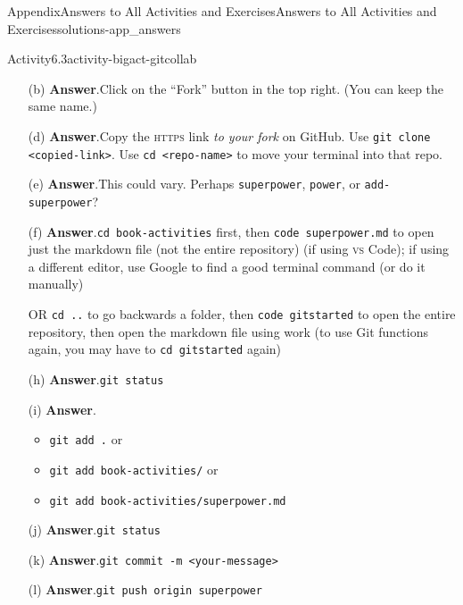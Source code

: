 \documentclass[twoside,10pt,]{book}
\newcommand{\blocktitlefont}{\relax}
\newcommand{\mono}[1]{\texttt{#1}}
\newcommand{\initialism}[1]{\textsc{\MakeLowercase{#1}}}
\begin{document}
\begin{solutions-chapter}{Appendix}{Answers to All Activities and Exercises}{}{Answers to All Activities and Exercises}{}{}{solutions-app_answers}
\begin{activitysolution}{Activity}{6.3}{}{activity-bigact-gitcollab}
\begin{enumerate}[font=\bfseries,label=(\alph*),ref=\alph*]%
\item[(b)]\noindent\textbf{\blocktitlefont Answer}.\hypertarget{answer-bigact-gitcollab-c-b-back}{}\quad{}Click on the ``Fork'' button in the top right. (You can keep the same name.)%
\item[(d)]\noindent\textbf{\blocktitlefont Answer}.\hypertarget{answer-bigact-gitcollab-e-b-back}{}\quad{}Copy the \initialism{HTTPS} link \emph{to your fork} on GitHub. Use \mono{git clone <copied-link>}. Use \mono{cd <repo-name>} to move your terminal into that repo.%
\item[(e)]\noindent\textbf{\blocktitlefont Answer}.\hypertarget{answer-bigact-gitcollab-f-b-back}{}\quad{}This could vary. Perhaps \mono{superpower}, \mono{power}, or \mono{add-superpower}?%
\item[(f)]\noindent\textbf{\blocktitlefont Answer}.\hypertarget{answer-bigact-gitcollab-g-b-back}{}\quad{}\mono{cd book-activities} first, then \mono{code superpower.md} to open just the markdown file (not the entire repository) (if using \initialism{VS} Code); if using a different editor, use Google to find a good terminal command (or do it manually)%
\par
OR \mono{cd ..} to go backwards a folder, then \mono{code gitstarted} to open the entire repository, then open the markdown file using work (to use Git functions again, you may have to \mono{cd gitstarted} again)%
\item[(h)]\noindent\textbf{\blocktitlefont Answer}.\hypertarget{answer-bigact-gitcollab-i-b-back}{}\quad{}\mono{git status}%
\item[(i)]\noindent\textbf{\blocktitlefont Answer}.\hypertarget{answer-bigact-gitcollab-j-b-back}{}\quad{}%
\begin{itemize}[label=\textbullet]
\item{}\mono{git add .} or%
\item{}\mono{git add book-activities/} or%
\item{}\mono{git add book-activities/superpower.md}%
\end{itemize}
%
\item[(j)]\noindent\textbf{\blocktitlefont Answer}.\hypertarget{answer-bigact-gitcollab-k-b-back}{}\quad{}\mono{git status}%
\item[(k)]\noindent\textbf{\blocktitlefont Answer}.\hypertarget{answer-bigact-gitcollab-l-b-back}{}\quad{}\mono{git commit -m \textquotesingle{}<your-message>\textquotesingle{}}%
\item[(l)]\noindent\textbf{\blocktitlefont Answer}.\hypertarget{answer-bigact-gitcollab-m-b-back}{}\quad{}\mono{git push origin superpower}%

\end{enumerate}
\end{activitysolution}
\end{solutions-chapter}
\end{document}
